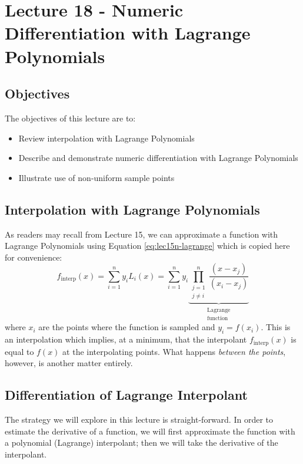 \chapter{Lecture 18 - Numeric Differentiation with Lagrange Polynomials}
\label{ch:lec18n}
\section{Objectives}
The objectives of this lecture are to:
\begin{itemize}
\item Review interpolation with Lagrange Polynomials
\item Describe and demonstrate numeric differentiation with Lagrange Polynomials
\item Illustrate use of non-uniform sample points
\end{itemize}
\setcounter{lstannotation}{0}

\section{Interpolation with Lagrange Polynomials}
As readers may recall from Lecture 15, we can approximate a function with Lagrange Polynomials using Equation \ref{eq:lec15n-lagrange} which is copied here for convenience:
\begin{equation*}
f_{\text{interp}}(x) = \sum\limits_{i=1}^{n} y_i L_i(x) = \sum\limits_{i=1}^{n} y_i \underbrace{\prod_{\substack{j=1 \\ j \ne i}}^{n} \frac{(x - x_j)}{(x_i - x_j)}}_{\substack{\text{Lagrange} \\ \text{function}}}
\end{equation*}
where $x_i$ are the points where the function is sampled and $y_i = f(x_i)$.  This is an interpolation which implies, at a minimum, that the interpolant $f_{\text{interp}}(x)$ is equal to $f(x)$ at the interpolating points.  What happens \emph{between the points}, however, is another matter entirely.  

\section{Differentiation of Lagrange Interpolant}
The strategy we will explore in this lecture is straight-forward.  In order to estimate the derivative of a function, we will first approximate the function with a polynomial (Lagrange) interpolant; then we will take the derivative of the interpolant.  


